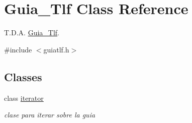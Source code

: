 \hypertarget{classGuia__Tlf}{}\section{Guia\+\_\+\+Tlf Class Reference}
\label{classGuia__Tlf}


T.\+D.\+A. \mbox{\hyperlink{classGuia__Tlf}{Guia\+\_\+\+Tlf}}.  




{\ttfamily \#include $<$guiatlf.\+h$>$}

\subsection*{Classes}
\begin{DoxyCompactItemize}
\item 
class \mbox{\hyperlink{classGuia__Tlf_1_1iterator}{iterator}}
\begin{DoxyCompactList}\small\item\em clase para iterar sobre la guia \end{DoxyCompactList}\end{DoxyCompactItemize}
